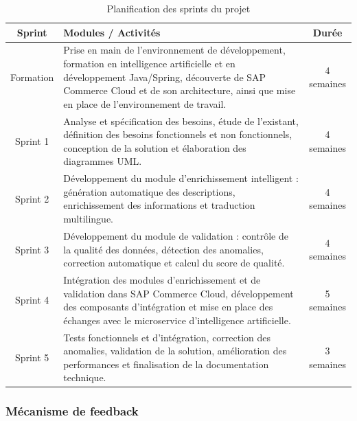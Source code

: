 \begin{table}[H]
\centering
\caption{Planification des sprints du projet}
\label{tab:planning_sprints}
\renewcommand{\arraystretch}{1.6}
\begin{tabular}{|c|p{11cm}|c|}
\hline
\textbf{Sprint} & \textbf{Modules / Activités} & \textbf{Durée} \\
\hline

Formation &
Prise en main de l'environnement de développement, formation en intelligence artificielle et en développement Java/Spring, découverte de SAP Commerce Cloud et de son architecture, ainsi que mise en place de l'environnement de travail. &
4 semaines \\
\hline

Sprint 1 &
Analyse et spécification des besoins, étude de l'existant, définition des besoins fonctionnels et non fonctionnels, conception de la solution et élaboration des diagrammes UML. &
4 semaines \\
\hline

Sprint 2 &
Développement du module d'enrichissement intelligent : génération automatique des descriptions, enrichissement des informations et traduction multilingue. &
4 semaines \\
\hline

Sprint 3 &
Développement du module de validation : contrôle de la qualité des données, détection des anomalies, correction automatique et calcul du score de qualité. &
4 semaines \\
\hline

Sprint 4 &
Intégration des modules d'enrichissement et de validation dans SAP Commerce Cloud, développement des composants d'intégration et mise en place des échanges avec le microservice d'intelligence artificielle. &
5 semaines \\
\hline

Sprint 5 &
Tests fonctionnels et d'intégration, correction des anomalies, validation de la solution, amélioration des performances et finalisation de la documentation technique. &
3 semaines \\
\hline

\end{tabular}
\end{table}



\newpage

\subsubsection{Mécanisme de feedback}

